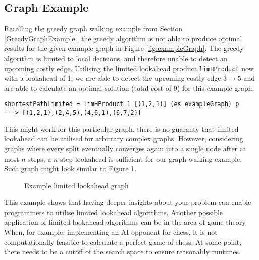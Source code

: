 \documentclass[runningheads]{llncs}
\begin{document}
\subsection{Graph Example}
Recalling the greedy graph walking example from Section \ref{GreedyGraphExample}, the greedy algorithm is not able to produce optimal results for the given example graph in Figure \ref{fig:exampleGraph}. The greedy algorithm is limited to local decisions, and therefore unable to detect an upcoming costly edge. Utilising the limited lookahead product \texttt{limHProduct} now with a lookahead of 1, we are able to detect the upcoming costly edge $3 \rightarrow 5$ and are able to calculate an optimal solution (total cost of 9) for this example graph:
\begin{verbatim}
shortestPathLimited = limHProduct 1 [(1,2,1)] (es exampleGraph) p
---> [(1,2,1),(2,4,5),(4,6,1),(6,7,2)]
\end{verbatim}
This might work for this particular graph, there is no guaranty that limited lookahead can be utilised for arbitrary complex graphs. However, considering graphs where every split eventually converges again into a single node after at most $n$ steps, a $n$-step lookahead is sufficient for our graph walking example. Such graph might look similar to Figure \ref{fig:DimondGraph}.
\begin{figure}[!ht]
\centering
{}
    \caption{Example limited lookahead graph}
    \label{fig:DimondGraph}
\end{figure}

This example shows that having deeper insights about your problem can enable programmers to utilise limited lookahead algorithms. Another possible application of limited lookahead algorithms can be in the area of game theory. When, for example,  implementing an AI opponent for chess, it is not computationally feasible to calculate a perfect game of chess. At some point, there needs to be a cutoff of the search space to ensure reasonably runtimes.
%
%
%
\end{document}
